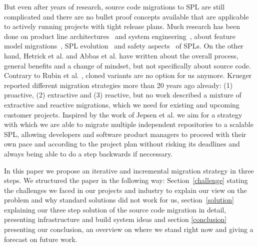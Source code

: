 But even after years of research, source code migrations to SPL are still
complicated and there are no bullet proof concepts available that are applicable
to actively running projects with tight release plans. Much research has been
done on product line architectures~\cite{Svahnberg1999EPLA,
confsplcTomashchukLJ21} and system engineering~\cite{confsplcSchaferBAKR21},
about feature model migrations~\cite{ncstrlustuttgartfiINPROC200185,
confsplcGrunerBKR20, confsplcDuszynskiDB19, confsplcFritschAR20}, SPL
evolution~\cite{journalssmrQuintonVRBGS21, Svahnberg1999ESPL, Eise02b,
kconfigKernel} and safety aspects~\cite{confsplcWolschke0SAM19} of SPLs. On the
other hand, Hetrick et al. \cite{confoopslaHetrickKM06} and Abbas et al.
\cite{confsplcAbbasJLESS20} have written about the overall process, general
benefits and a change of mindset, but not specifically about source code.
Contrary to Rubin et al. \cite{confsplcRubinCC13}, cloned variants are no option
for us anymore. Krueger \cite{Krueger2001SMC} reported different migration
strategies more than 20 years ago already: (1) proactive, (2) extractive and (3)
reactive, but no work described a mixture of extractive and reactive migrations,
which we need for existing and upcoming customer projects. Inspired by the work
of Jepsen et al. \cite{confsplcJepsenDB07} we aim for a strategy with which we
are able to migrate multiple independent repositories to a scalable SPL,
allowing developers and software product managers to proceed with their own pace
and according to the project plan without risking its deadlines and always being
able to do a step backwards if neccessary.

In this paper we propose an iterative and incremental migration strategy in
three steps. We structured the paper in the following way:
Section~\ref{challenge} stating the challenges we faced in our projects and
industry to explain our view on the problem and why standard solutions did not
work for us, section~\ref{solution} explaining our three step solution of the
source code migration in detail, presenting infrastructure and build system
ideas and section \ref{conclusion} presenting our conclusion, an overview on
where we stand right now and giving a forecast on future work.
